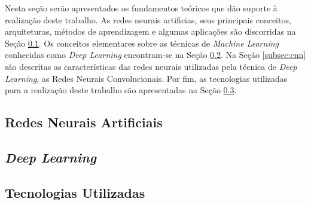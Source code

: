 Nesta seção serão apresentados os fundamentos teóricos que dão suporte à realização deste trabalho. As redes neurais artificias, seus principais conceitos, arquiteturas, métodos de aprendizagem e algumas aplicações são discorridas na Seção \ref{subsec:rna}. Os conceitos elementares sobre as técnicas de \textit{Machine Learning} conhecidas como \textit{Deep Learning} encontram-se na Seção \ref{subsec:deep}. Na Seção \ref{subsec:cnn} são descritas as características das redes neurais utilizadas pela técnica de \textit{Deep Learning}, as Redes Neurais Convolucionais. Por fim, as tecnologias utilizadas para a realização deste trabalho são apresentadas na Seção \ref{subsec:tecnologias}.

\subsection{Redes Neurais Artificiais} \label{subsec:rna}


\subsection{\textit{Deep Learning}} \label{subsec:deep}


\subsection{Tecnologias Utilizadas} \label{subsec:tecnologias}

